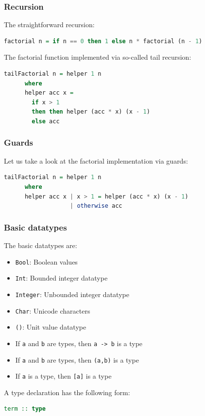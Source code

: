 \documentclass[10pt,pdf,utf8,russian,aspectratio=169]{beamer}
\begin{document}
\begin{frame}[fragile]
  \frametitle{Recursion}

  The straightforward recursion:
  \begin{lstlisting}[language=Haskell]
    factorial n = if n == 0 then 1 else n * factorial (n - 1)
  \end{lstlisting}

  \vspace{\baselineskip}

  The factorial function implemented via so-called tail recursion:
  \begin{lstlisting}[language=Haskell]
    tailFactorial n = helper 1 n
      where
      helper acc x =
        if x > 1
        then then helper (acc * x) (x - 1)
        else acc
  \end{lstlisting}
\end{frame}

\begin{frame}[fragile]
  \frametitle{Guards}

  Let us take a look at the factorial implementation via guards:

  \begin{lstlisting}[language=Haskell]
    tailFactorial n = helper 1 n
      where
      helper acc x | x > 1 = helper (acc * x) (x - 1)
                   | otherwise acc
  \end{lstlisting}
\end{frame}

\begin{frame}[fragile]
  \frametitle{Basic datatypes}
  The basic datatypes are:
  \begin{itemize}
    \item \verb"Bool": Boolean values
    \item \verb"Int": Bounded integer datatype
    \item \verb"Integer": Unbounded integer datatype
    \item \verb"Char": Unicode characters
    \item \verb"()": Unit value datatype
    \item If \verb"a" and \verb"b" are types, then \verb"a -> b" is a type
    \item If \verb"a" and \verb"b" are types, then \verb"(a,b)" is a type
    \item If \verb"a" is a type, then \verb"[a]" is a type
  \end{itemize}

  A type declaration has the following form:

  \begin{lstlisting}[language=Haskell]
    term :: type
  \end{lstlisting}
\end{frame}
\end{document}
